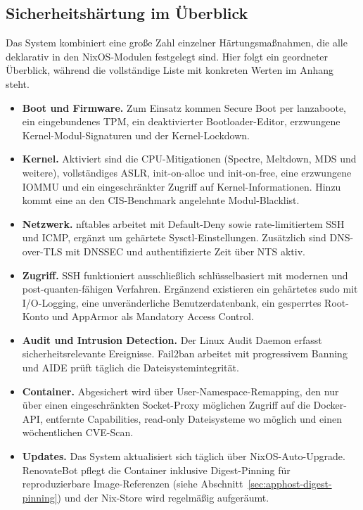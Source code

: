 \subsection{Sicherheitshärtung im Überblick}

Das System kombiniert eine große Zahl einzelner Härtungsmaßnahmen, die alle
deklarativ in den NixOS-Modulen festgelegt sind. Hier folgt ein geordneter
Überblick, während die vollständige Liste mit konkreten Werten im Anhang
steht.

\begin{itemize}
  \item \textbf{Boot und Firmware.} Zum Einsatz kommen Secure Boot per
    lanzaboote, ein eingebundenes \ac{TPM}, ein deaktivierter
    Bootloader-Editor, erzwungene Kernel-Modul-Signaturen und der
    Kernel-Lockdown.
  \item \textbf{Kernel.} Aktiviert sind die \ac{CPU}-Mitigationen (Spectre,
    Meltdown, MDS und weitere), vollständiges \ac{ASLR}, init-on-alloc und
    init-on-free, eine erzwungene \ac{IOMMU} und ein eingeschränkter Zugriff
    auf Kernel-Informationen. Hinzu kommt eine an den \ac{CIS}-Benchmark
    angelehnte Modul-Blacklist.
  \item \textbf{Netzwerk.} nftables arbeitet mit Default-Deny sowie
    rate-limitiertem \ac{SSH} und \ac{ICMP}, ergänzt um gehärtete
    Sysctl-Einstellungen. Zusätzlich sind \ac{DNS}-over-\ac{TLS} mit
    \ac{DNSSEC} und authentifizierte Zeit über \ac{NTS} aktiv.
  \item \textbf{Zugriff.} \ac{SSH} funktioniert ausschließlich
    schlüsselbasiert mit modernen und post-quanten-fähigen Verfahren.
    Ergänzend existieren ein gehärtetes sudo mit I/O-Logging, eine
    unveränderliche Benutzerdatenbank, ein gesperrtes Root-Konto und AppArmor
    als Mandatory Access Control.
  \item \textbf{Audit und Intrusion Detection.} Der Linux Audit Daemon
    erfasst sicherheitsrelevante Ereignisse. Fail2ban arbeitet mit
    progressivem Banning und \ac{AIDE} prüft täglich die
    Dateisystemintegrität.
  \item \textbf{Container.} Abgesichert wird über User-Namespace-Remapping,
    den nur über einen eingeschränkten Socket-Proxy möglichen Zugriff auf die
    Docker-\ac{API}, entfernte Capabilities, read-only Dateisysteme wo
    möglich und einen wöchentlichen \ac{CVE}-Scan.
  \item \textbf{Updates.} Das System aktualisiert sich täglich über
    NixOS-Auto-Upgrade. RenovateBot pflegt die Container inklusive
    Digest-Pinning für reproduzierbare Image-Referenzen
    (siehe Abschnitt~\ref{sec:apphost-digest-pinning}) und der Nix-Store wird
    regelmäßig aufgeräumt.
\end{itemize}

